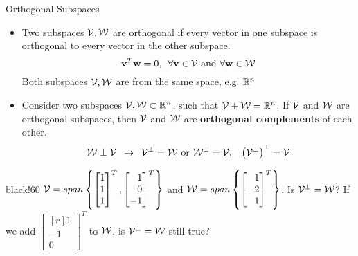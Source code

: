\documentclass[aspectratio=169]{beamer}
\def\mf{\ensuremath\mathbf}
\def\mb{\ensuremath\mathbb}
\def\mc{\ensuremath\mathcal}
\newcommand{\demoex}[2]{\onslide<#1->\begin{color}{black!60} #2 \end{color}}
\begin{document}
\begin{frame}[t]{Orthogonal Subspaces}
\vspace{-0.25cm}
\begin{itemize}
\item Two subspaces $\mc{V}, \mc{W}$ are orthogonal if every vector in one subspace is orthogonal to every vector in the other subspace.
\[ \mf{v}^T\mf{w} = 0, \,\,\, \forall \mf{v} \in \mc{V} \text{ and } \forall\mf{w} \in \mc{W} \]
Both subspaces $\mc{V}, \mc{W}$ are from the same space, e.g. $\mb{R}^n$

\item Consider two subspaces $\mc{V}, \mc{W} \subset \mb{R}^n$, such that $\mc{V} + \mc{W} = \mb{R}^n$. If $\mc{V}$ and $\mc{W}$ are orthogonal subspaces, then $\mc{V}$ and $\mc{W}$ are \textbf{orthogonal complements} of each other.
\[ \mc{W} \perp \mc{V}\,\,\, \rightarrow \,\,\, \mc{V}^{\perp} = \mc{W} \text{ or } \mc{W}^{\perp} = \mc{V}; \,\,\,\,\, \left(\mc{V}^{\perp}\right)^{\perp} = \mc{V} \]
\end{itemize}

\begin{small}
\demoex{2}{
$\mc{V} = span \left\{\begin{bmatrix*}[r]1\\1\\1\end{bmatrix*}^T, \begin{bmatrix*}[r]1\\0\\-1\end{bmatrix*}^T\right\}$ and $\mc{W} = span \left\{\begin{bmatrix*}[r]1\\-2\\1\end{bmatrix*}^T\right\}$. Is $\mc{V}^\perp = \mc{W}$? If we add $\begin{bmatrix*}[r]1\\-1\\0\end{bmatrix*}^T$ to $\mc{W}$, is $\mc{V}^\perp = \mc{W}$ still true?
}
\end{small}
\end{frame}
\end{document}
